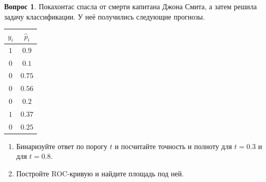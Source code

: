 \documentclass[12pt]{article}
\theoremstyle{definition}
\newtheorem{question}{Вопрос}
\begin{document}
\begin{question}
    Покахонтас спасла от смерти капитана Джона Смита, а затем решила задачу классификации. У неё получились следующие прогнозы. 
    
    \begin{center}
      \begin{tabular}{c|c}
        $y_i$ & $\hat p_i$ \\
        \hline
        $1$  & $0.9$ \\
        $0$ & $0.1$ \\
        $0$ & $0.75$ \\
        $0$ & $0.56$ \\
        $0$ & $0.2$ \\
        $1$ & $0.37$ \\
        $0$ & $0.25$ \\   
      \end{tabular}
    \end{center}
    
    \begin{enumerate}
      \item  Бинаризуйте ответ по порогу $t$ и посчитайте точность и полноту для $t = 0.3$ и для  $t = 0.8$.
      \item Постройте ROC-кривую и найдите площадь под ней. 
    \end{enumerate}
\end{question}
\end{document}
